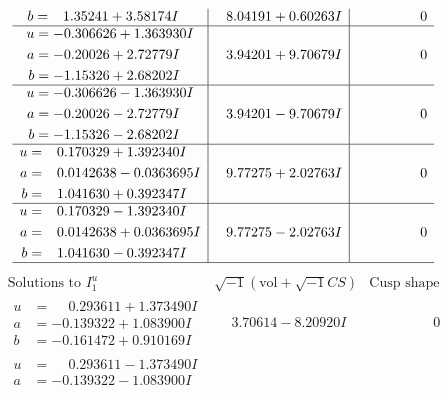 \documentclass[1p]{elsarticle_modified}
\theoremstyle{definition}
\newcommand{\I}{\sqrt{-1}}
\begin{document}
$$\begin{array}{c|c|c}
\begin{aligned}
b &= \phantom{-}1.35241 + 3.58174 I\end{aligned}
 & \phantom{-}8.04191 + 0.60263 I & \phantom{-0.000000 } 0 \\ \hline\begin{aligned}
u &= -0.306626 + 1.363930 I \\
a &= -0.20026 + 2.72779 I \\
b &= -1.15326 + 2.68202 I\end{aligned}
 & \phantom{-}3.94201 + 9.70679 I & \phantom{-0.000000 } 0 \\ \hline\begin{aligned}
u &= -0.306626 - 1.363930 I \\
a &= -0.20026 - 2.72779 I \\
b &= -1.15326 - 2.68202 I\end{aligned}
 & \phantom{-}3.94201 - 9.70679 I & \phantom{-0.000000 } 0 \\ \hline\begin{aligned}
u &= \phantom{-}0.170329 + 1.392340 I \\
a &= \phantom{-}0.0142638 - 0.0363695 I \\
b &= \phantom{-}1.041630 + 0.392347 I\end{aligned}
 & \phantom{-}9.77275 + 2.02763 I & \phantom{-0.000000 } 0 \\ \hline\begin{aligned}
u &= \phantom{-}0.170329 - 1.392340 I \\
a &= \phantom{-}0.0142638 + 0.0363695 I \\
b &= \phantom{-}1.041630 - 0.392347 I\end{aligned}
 & \phantom{-}9.77275 - 2.02763 I & \phantom{-0.000000 } 0\\
 \hline 
 \end{array}$$\newpage$$\begin{array}{c|c|c}  
\text{Solutions to }I^u_{1}& \I (\text{vol} + \sqrt{-1}CS) & \text{Cusp shape}\\
 \hline 
\begin{aligned}
u &= \phantom{-}0.293611 + 1.373490 I \\
a &= -0.139322 + 1.083900 I \\
b &= -0.161472 + 0.910169 I\end{aligned}
 & \phantom{-}3.70614 - 8.20920 I & \phantom{-0.000000 } 0 \\ \hline\begin{aligned}
u &= \phantom{-}0.293611 - 1.373490 I \\
a &= -0.139322 - 1.083900 I \\

\end{aligned}
\end{array}$$
\end{document}
